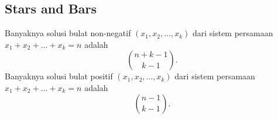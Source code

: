 \subsection{Stars and Bars}
Banyaknya solusi bulat non-negatif $(x_1,x_2,\dots,x_k)$ dari sistem persamaan $x_1+x_2+\dots+x_k=n$ adalah
$${n+k-1 \choose k-1}.$$
Banyaknya solusi bulat positif $(x_1,x_2,\dots,x_k)$ dari sistem persamaan $x_1+x_2+\dots+x_k=n$ adalah
$${n-1 \choose k-1}.$$

